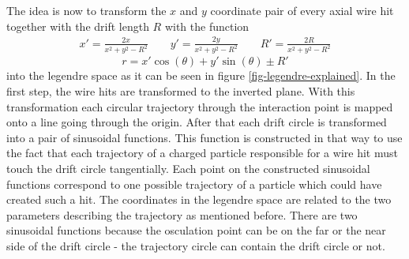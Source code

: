 The idea is now to transform the $x$ and $y$ coordinate pair of every axial wire hit together with the drift length $R$ with the function
\begin{align*} x' = \frac{2x}{x^2 + y^2 - R^2} \qquad y' = \frac{2y}{x^2 + y^2 - R^2}  \qquad R' = \frac{2R}{x^2 + y^2 - R^2} \end{align*}
$$r = x' \cos(\theta) + y' \sin(\theta) \pm R'$$
into the legendre space as it can be seen in figure \ref{fig-legendre-explained}. In the first step, the wire hits are transformed to the inverted plane. With this transformation each circular trajectory through the interaction point is mapped onto a line going through the origin. After that each drift circle is transformed into a pair of sinusoidal functions. This function is constructed in that way to use the fact that each trajectory of a charged particle responsible for a wire hit must touch the drift circle tangentially. Each point on the constructed sinusoidal functions correspond to one possible trajectory of a particle which could have created such a hit. The coordinates in the legendre space are related to the two parameters describing the trajectory as mentioned before. There are two sinusoidal functions because the osculation point can be on the far or the near side of the drift circle - the trajectory circle can contain the drift circle or not.

